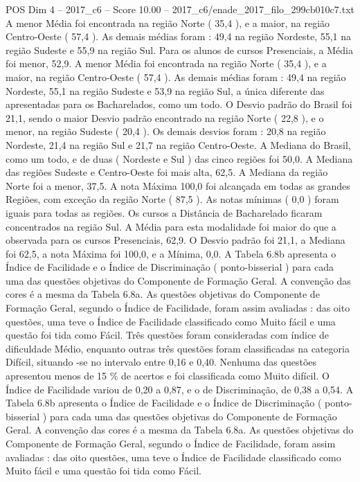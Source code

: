 \begin{textsample}{POS Dim 4 – 2017\_c6 – Score 10.00 – 2017\_c6/enade\_2017\_filo\_299cb010c7.txt}
A menor Média foi encontrada na região Norte ( 35,4 ), e a maior, na região Centro-Oeste ( 57,4 ).
As demais médias foram : 49,4 na região Nordeste, 55,1 na região Sudeste e 55,9 na região Sul.
Para os alunos de cursos Presenciais, a Média foi menor, 52,9.
A menor Média foi encontrada na região Norte ( 35,4 ), e a maior, na região Centro-Oeste ( 57,4 ).
As demais médias foram : 49,4 na região Nordeste, 55,1 na região Sudeste e 53,9 na região Sul, a única diferente das apresentadas para os Bacharelados, como um todo.
O Desvio padrão do Brasil foi 21,1, sendo o maior Desvio padrão encontrado na região Norte ( 22,8 ), e o menor, na região Sudeste ( 20,4 ).
Os demais desvios foram : 20,8 na região Nordeste, 21,4 na região Sul e 21,7 na região Centro-Oeste.
A Mediana do Brasil, como um todo, e de duas ( Nordeste e Sul ) das cinco regiões foi 50,0.
A Mediana das regiões Sudeste e Centro-Oeste foi mais alta, 62,5.
A Mediana da região Norte foi a menor, 37,5.
A nota Máxima 100,0 foi alcançada em todas as grandes Regiões, com exceção da região Norte ( 87,5 ).
As notas mínimas ( 0,0 ) foram iguais para todas as regiões.
Os cursos a Distância de Bacharelado ficaram concentrados na região Sul.
A Média para esta modalidade foi maior do que a observada para os cursos Presenciais, 62,9.
O Desvio padrão foi 21,1, a Mediana foi 62,5, a nota Máxima foi 100,0, e a Mínima, 0,0.
A Tabela 6.8b apresenta o Índice de Facilidade e o Índice de Discriminação ( ponto-bisserial ) para cada uma das questões objetivas do Componente de Formação Geral.
A convenção das cores é a mesma da Tabela 6.8a.
As questões objetivas do Componente de Formação Geral, segundo o Índice de Facilidade, foram assim avaliadas : das oito questões, uma teve o Índice de Facilidade classificado como Muito fácil e uma questão foi tida como Fácil.
Três questões foram consideradas com índice de dificuldade Médio, enquanto outras três questões foram classificadas na categoria Difícil, situando -se no intervalo entre 0,16 e 0,40.
Nenhuma das questões apresentou menos de 15 \% de acertos e foi classificada como Muito difícil.
O Índice de Facilidade variou de 0,20 a 0,87, e o de Discriminação, de 0,38 a 0,54.
A Tabela 6.8b apresenta o Índice de Facilidade e o Índice de Discriminação ( ponto-bisserial ) para cada uma das questões objetivas do Componente de Formação Geral.
A convenção das cores é a mesma da Tabela 6.8a.
As questões objetivas do Componente de Formação Geral, segundo o Índice de Facilidade, foram assim avaliadas : das oito questões, uma teve o Índice de Facilidade classificado como Muito fácil e uma questão foi tida como Fácil.

\end{textsample}
